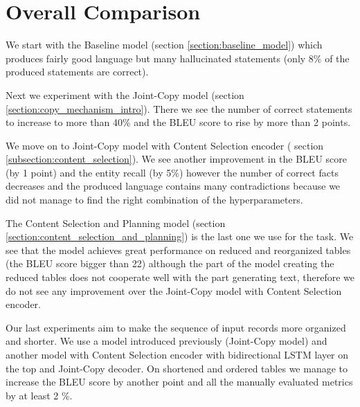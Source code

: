 \section{Overall Comparison}

We start with the Baseline model (section \ref{section:baseline_model}) which produces fairly good language but many hallucinated statements (only 8\% of the produced statements are correct).

Next we experiment with the Joint-Copy model (section \ref{section:copy_mechanism_intro}). There we see the number of correct statements to increase to more than 40\% and the BLEU score to rise by more than 2 points.

We move on to Joint-Copy model with Content Selection encoder ( section \ref{subsection:content_selection}). We see another improvement in the BLEU score (by 1 point) and the entity recall (by 5\%) however the number of correct facts decreases and the produced language contains many contradictions because we did not manage to find the right combination of the hyperparameters.

The Content Selection and Planning model (section \ref{section:content_selection_and_planning}) is the last one we use for the task. We see that the model achieves great performance on reduced and reorganized tables (the BLEU score bigger than 22) although the part of the model creating the reduced tables does not cooperate well with the part generating text, therefore we do not see any improvement over the Joint-Copy model with Content Selection encoder.

Our last experiments aim to make the sequence of input records more organized and shorter. We use a model introduced previously (Joint-Copy model) and another model with Content Selection encoder with bidirectional LSTM layer on the top and Joint-Copy decoder. On shortened and ordered tables we manage to increase the BLEU score by another point and all the manually evaluated metrics by at least 2 \%.

